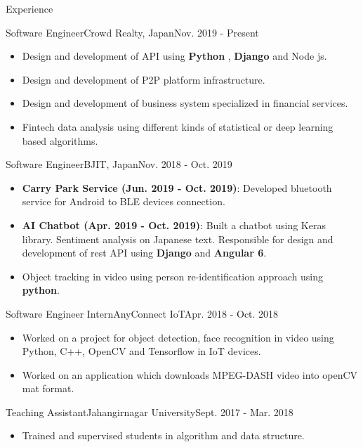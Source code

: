 \documentclass[]{mcdowellcv}
\def\first{8pt}
\begin{document}
	\begin{cvsection}{Experience}
		\begin{cvsubsection}{\hspace*{\first}Software Engineer}{Crowd Realty, Japan}{Nov. 2019 - Present}	
			\begin{itemize}
			     \item Design and development of API using \textbf{Python} ,  \textbf{Django}  and  Node js.
			     \item Design and development of P2P platform infrastructure.
			     \item Design and development of business system specialized in financial services.
			     \item Fintech data analysis using different kinds of statistical or deep learning  based algorithms.
			\end{itemize}
		\end{cvsubsection}
	   \begin{cvsubsection}{\hspace*{\first}Software Engineer}{BJIT, Japan}{Nov. 2018 - Oct. 2019}
			\begin{itemize}
			     \item \textbf{Carry Park Service (Jun. 2019 - Oct. 2019)}: Developed bluetooth service for Android to BLE devices connection.
				\item \textbf{AI Chatbot (Apr. 2019 - Oct. 2019)}: Built a chatbot using Keras library. Sentiment analysis on Japanese text. Responsible for design and development of  rest API using \textbf{Django} and \textbf{Angular 6}.
				\item Object tracking  in video using person re-identification approach using \textbf{python}.
			\end{itemize}
		\end{cvsubsection}
		 \begin{cvsubsection}{\hspace*{\first}Software Engineer Intern}{AnyConnect IoT}{Apr. 2018 - Oct. 2018}
			\begin{itemize}
			     \item  Worked on a project for object detection, face recognition in video using Python, C++, OpenCV and Tensorflow in IoT devices.
				\item Worked on an application which downloads MPEG-DASH video into openCV mat format.
			\end{itemize}
		\end{cvsubsection}
		\begin{cvsubsection}{\hspace*{\first}Teaching Assistant}{Jahangirnagar University}{Sept. 2017 - Mar. 2018}			
			\begin{itemize}
				\item Trained and supervised students in algorithm and data structure. 
			\end{itemize}
		\end{cvsubsection}
	\end{cvsection}
\end{document}
